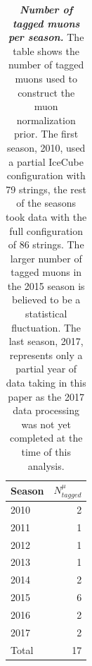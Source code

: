 \begin{table}
	\centering
	\begin{tabular}{l r}
		\toprule
		Season & $N^\mu_{tagged}$ \\
		\midrule
		2010 & 2 \\
		2011 & 1 \\
		2012 & 1 \\
		2013 & 1 \\
		2014 & 2 \\
		2015 & 6 \\
		2016 & 2 \\
		2017 & 2 \\
		\midrule
		Total & 17 \\
		\bottomrule
	\end{tabular}
	\caption{\textbf{\textit{Number of tagged muons per season.}}
		The table shows the number of tagged muons used to construct the muon normalization prior.
		The first season, 2010, used a partial IceCube configuration with 79 strings, the rest of the seasons took data with the full configuration of 86 strings.
		The larger number of tagged muons in the 2015 season is believed to be a statistical fluctuation.
		The last season, 2017, represents only a partial year of data taking in this paper as the 2017 data processing was not yet completed at the time of this analysis.}\label{tbl:tag_muons}
\end{table}
